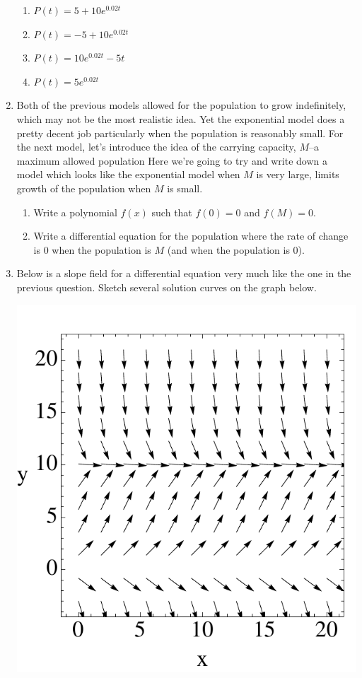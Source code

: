 \documentclass[12pt]{article}
\begin{document}
\begin{enumerate}
\begin{enumerate}
\item $P(t) =5 + 10 e^{0.02 t}$ \vfill
\item $P(t) =-5 + 10 e^{0.02 t}$ \vfill
\item $P(t) =10 e^{0.02 t } - 5 t$  \vfill
\item $P(t) =5 e^{0.02 t } $\vfill
\end{enumerate}
\newpage
\item Both of the previous models allowed for the population to grow indefinitely, which may not be the most realistic idea. Yet the exponential model does a pretty decent job particularly when the population is reasonably small. For the next model, let's introduce the idea of the carrying capacity, $M$--a maximum allowed population Here we're going to try and write down a model which looks like the exponential model when $M$ is very large, limits growth of the population when $M$ is small.
\begin{enumerate}
\item Write a polynomial $f(x)$ such that $f(0) = 0$ and $f(M) = 0$. \vfill
\item Write a differential equation for the population where the rate of change is 0 when the population is $M$ (and when the population is 0). \vfill
\end{enumerate}

\item Below is a slope field for a differential equation very much like the one in the previous question. Sketch several solution curves on the graph below.\\
\begin{center}
\includegraphics{simple_slope_field.pdf}
\end{center} \vfill
\end{enumerate}
\end{document}
